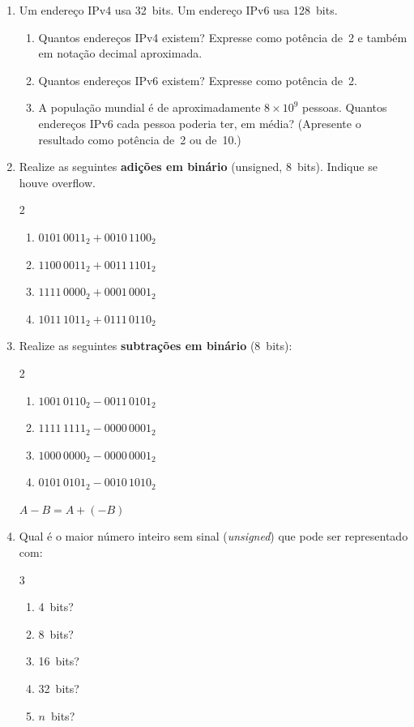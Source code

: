 \documentclass[11pt, a4paper]{article}
\begin{document}
\begin{enumerate}
\item Um endere\c{c}o IPv4 usa 32~bits. Um endere\c{c}o IPv6 usa 128~bits.
\begin{enumerate}
  \item Quantos endere\c{c}os IPv4 existem? Expresse como pot\^{e}ncia de~2 e tamb\'{e}m em nota\c{c}\~{a}o decimal aproximada.
  \item Quantos endere\c{c}os IPv6 existem? Expresse como pot\^{e}ncia de~2.
  \item A popula\c{c}\~{a}o mundial \'{e} de aproximadamente $8 \times 10^9$ pessoas. Quantos endere\c{c}os IPv6 cada pessoa poderia ter, em m\'{e}dia? (Apresente o resultado como pot\^{e}ncia de~2 ou de~10.)
\end{enumerate}
\item Realize as seguintes \textbf{adi\c{c}\~{o}es em bin\'{a}rio} (unsigned, 8~bits). Indique se houve overflow.
\begin{multicols}{2}
\begin{enumerate}
  \item $0101\,0011_2 + 0010\,1100_2$
  \item $1100\,0011_2 + 0011\,1101_2$
  \item $1111\,0000_2 + 0001\,0001_2$
  \item $1011\,1011_2 + 0111\,0110_2$
\end{enumerate}
\end{multicols}

\item Realize as seguintes \textbf{subtra\c{c}\~{o}es em bin\'{a}rio} (8~bits):
\begin{multicols}{2}
\begin{enumerate}
  \item $1001\,0110_2 - 0011\,0101_2$
  \item $1111\,1111_2 - 0000\,0001_2$
  \item $1000\,0000_2 - 0000\,0001_2$
  \item $0101\,0101_2 - 0010\,1010_2$
\end{enumerate}
\end{multicols}
\vspace{-4pt}
\begin{dica}
$A - B = A + (-B)$
\end{dica}

\item Qual \'{e} o maior n\'{u}mero inteiro sem sinal (\emph{unsigned}) que pode ser representado com:
\begin{multicols}{3}
\begin{enumerate}
  \item 4~bits?
  \item 8~bits?
  \item 16~bits?
  \item 32~bits?
  \item $n$~bits?
\end{enumerate}
\end{multicols}


\end{enumerate}
\end{document}
